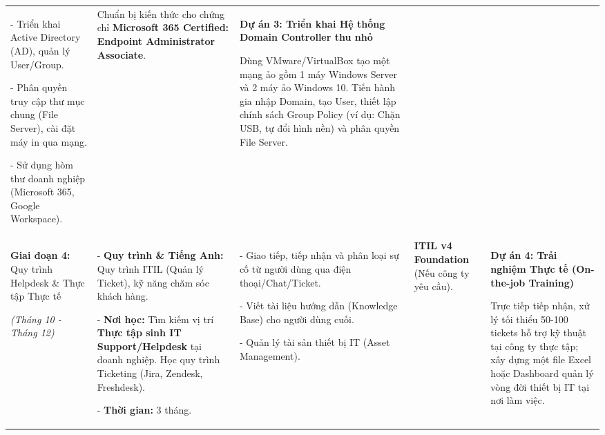 \documentclass[
]{article}
\begin{document}
\begin{longtable}[]{@{}lllll@{}}
\begin{minipage}[t]{0.17\columnwidth}
- Triển khai Active Directory (AD), quản lý User/Group.

- Phân quyền truy cập thư mục chung (File Server), cài đặt máy in qua
mạng.

- Sử dụng hòm thư doanh nghiệp (Microsoft 365, Google Workspace).\strut
\end{minipage} & \begin{minipage}[t]{0.17\columnwidth}\raggedright
Chuẩn bị kiến thức cho chứng chỉ \textbf{Microsoft 365 Certified:
Endpoint Administrator Associate}.\strut
\end{minipage} & \begin{minipage}[t]{0.17\columnwidth}\raggedright
\textbf{Dự án 3: Triển khai Hệ thống Domain Controller thu nhỏ}

Dùng VMware/VirtualBox tạo một mạng ảo gồm 1 máy Windows Server và 2 máy
ảo Windows 10. Tiến hành gia nhập Domain, tạo User, thiết lập chính sách
Group Policy (ví dụ: Chặn USB, tự đổi hình nền) và phân quyền File
Server.\strut
\end{minipage}\tabularnewline
\begin{minipage}[t]{0.17\columnwidth}\raggedright
\textbf{Giai đoạn 4:} Quy trình Helpdesk \& Thực tập Thực tế

\emph{(Tháng 10 - Tháng 12)}\strut
\end{minipage} & \begin{minipage}[t]{0.17\columnwidth}\raggedright
- \textbf{Quy trình \& Tiếng Anh:} Quy trình ITIL (Quản lý Ticket), kỹ
năng chăm sóc khách hàng.

- \textbf{Nơi học:} Tìm kiếm vị trí \textbf{Thực tập sinh IT
Support/Helpdesk} tại doanh nghiệp. Học quy trình Ticketing (Jira,
Zendesk, Freshdesk).

- \textbf{Thời gian:} 3 tháng.\strut
\end{minipage} & \begin{minipage}[t]{0.17\columnwidth}\raggedright
- Giao tiếp, tiếp nhận và phân loại sự cố từ người dùng qua điện
thoại/Chat/Ticket.

- Viết tài liệu hướng dẫn (Knowledge Base) cho người dùng cuối.

- Quản lý tài sản thiết bị IT (Asset Management).\strut
\end{minipage} & \begin{minipage}[t]{0.17\columnwidth}\raggedright
\textbf{ITIL v4 Foundation} (Nếu công ty yêu cầu).\strut
\end{minipage} & \begin{minipage}[t]{0.17\columnwidth}\raggedright
\textbf{Dự án 4: Trải nghiệm Thực tế (On-the-job Training)}

Trực tiếp tiếp nhận, xử lý tối thiểu 50-100 tickets hỗ trợ kỹ thuật tại
công ty thực tập; xây dựng một file Excel hoặc Dashboard quản lý vòng
đời thiết bị IT tại nơi làm việc.\strut
\end{minipage}\tabularnewline
\bottomrule
\end{longtable}
\end{document}
